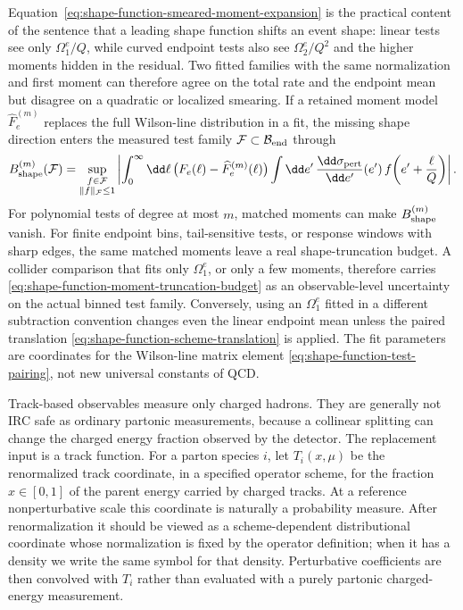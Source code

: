 \begin{controlledapproximation}
Equation~\eqref{eq:shape-function-smeared-moment-expansion} is the practical
content of the sentence that a leading shape function shifts an event shape:
linear tests see only \(\Omega_1^e/Q\), while curved endpoint tests also see
\(\Omega_2^e/Q^2\) and the higher moments hidden in the residual.  Two fitted
families with the same normalization and first moment can therefore agree on
the total rate and the endpoint mean but disagree on a quadratic or localized
smearing.  If a retained moment model \(\widehat F_e^{(m)}\) replaces the
full Wilson-line distribution in a fit, the missing shape direction enters
the measured test family \(\mathcal F\subset\mathcal B_{\rm end}\) through
\begin{equation}
  B_{\rm shape}^{(m)}(\mathcal F)
  =
  \sup_{\substack{f\in\mathcal F\\ \|f\|_{\mathcal F}\le 1}}
  \left|
  \int_0^\infty \dd\ell\,
  \bigl(F_e(\ell)-\widehat F_e^{(m)}(\ell)\bigr)
  \int\dd e'\,
  \frac{\dd\sigma_{\rm pert}}{\dd e'}(e')\,
  f\!\left(e'+\frac{\ell}{Q}\right)
  \right| .
  \label{eq:shape-function-moment-truncation-budget}
\end{equation}
For polynomial tests of degree at most \(m\), matched moments can make
\(B_{\rm shape}^{(m)}\) vanish.  For finite endpoint bins, tail-sensitive
tests, or response windows with sharp edges, the same matched moments leave a
real shape-truncation budget.  A collider comparison that fits only
\(\Omega_1^e\), or only a few moments, therefore carries
\eqref{eq:shape-function-moment-truncation-budget} as an observable-level
uncertainty on the actual binned test family.  Conversely, using an
\(\Omega_1^e\) fitted in a different
subtraction convention changes even the linear endpoint mean unless the
paired translation
\eqref{eq:shape-function-scheme-translation} is applied.  The fit parameters
are coordinates for the Wilson-line matrix element
\eqref{eq:shape-function-test-pairing}, not new universal constants of QCD.
\end{controlledapproximation}

Track-based observables measure only charged hadrons.  They are generally not
IRC safe as ordinary partonic measurements, because a collinear splitting can
change the charged energy fraction observed by the detector.  The replacement
input is a track function.  For a parton species \(i\), let
\(T_i(x,\mu)\) be the renormalized track coordinate, in a specified operator
scheme, for the fraction \(x\in[0,1]\) of the parent energy carried by charged
tracks.  At a reference nonperturbative scale this coordinate is naturally a
probability measure.  After renormalization it should be viewed as a
scheme-dependent distributional coordinate whose normalization is fixed by the
operator definition; when it has a density we write the same symbol for that
density.  Perturbative coefficients are then convolved with \(T_i\) rather
than evaluated with a purely partonic charged-energy measurement.

